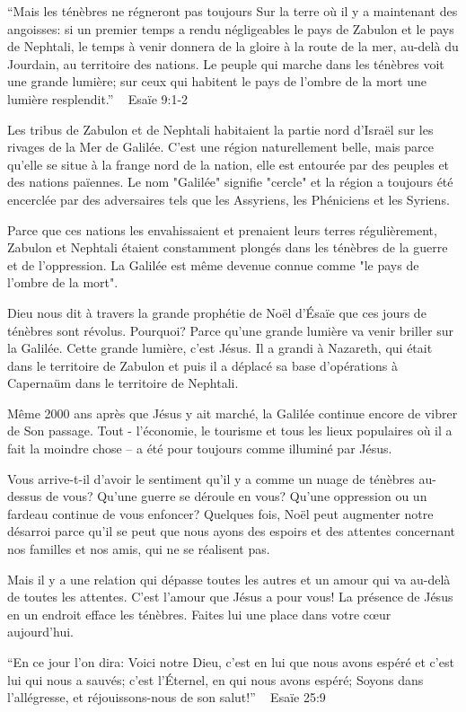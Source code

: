 

“Mais les ténèbres ne régneront pas toujours Sur la terre où il y a maintenant des angoisses: si un premier temps a rendu négligeables le pays de Zabulon et le pays de Nephtali, le temps à venir donnera de la gloire à la route de la mer, au-delà du Jourdain, au territoire des nations. Le peuple qui marche dans les ténèbres voit une grande lumière; sur ceux qui habitent le pays de l’ombre de la mort une lumière resplendit.” ~ Esaïe 9:1-2

Les tribus de Zabulon et de Nephtali habitaient la partie nord d'Israël sur les rivages de la Mer de Galilée. C'est une région naturellement belle, mais parce qu'elle se situe à la frange nord de la nation, elle est entourée par des peuples et des nations païennes. Le nom "Galilée" signifie "cercle" et la région a toujours été encerclée par des adversaires tels que les Assyriens, les Phéniciens et les Syriens.

Parce que ces nations les envahissaient et prenaient leurs terres régulièrement, Zabulon et Nephtali étaient constamment plongés dans les ténèbres de la guerre et de l'oppression. La Galilée est même devenue connue comme "le pays de l'ombre de la mort".

Dieu nous dit à travers la grande prophétie de Noël d'Ésaïe que ces jours de ténèbres sont révolus. Pourquoi? Parce qu'une grande lumière va venir briller sur la Galilée. Cette grande lumière, c'est Jésus. Il a grandi à Nazareth, qui était dans le territoire de Zabulon et puis il a déplacé sa base d'opérations à Capernaüm dans le territoire de Nephtali.

Même 2000 ans après que Jésus y ait marché, la Galilée continue encore de vibrer de Son passage. Tout - l'économie, le tourisme et tous les lieux populaires où il a fait la moindre chose – a été pour toujours comme illuminé par Jésus.

Vous arrive-t-il d'avoir le sentiment qu'il y a comme un nuage de ténèbres au-dessus de vous? Qu'une guerre se déroule en vous? Qu'une oppression ou un fardeau continue de vous enfoncer? Quelques fois, Noël peut augmenter notre désarroi parce qu'il se peut que nous ayons des espoirs et des attentes concernant nos familles et nos amis, qui ne se réalisent pas.

Mais il y a une relation qui dépasse toutes les autres et un amour qui va au-delà de toutes les attentes. C'est l'amour que Jésus a pour vous! La présence de Jésus en un endroit efface les ténèbres. Faites lui une place dans votre cœur aujourd'hui.

“En ce jour l’on dira: Voici notre Dieu, c’est en lui que nous avons espéré et c’est lui qui nous a sauvés; c’est l’Éternel, en qui nous avons espéré; Soyons dans l’allégresse, et réjouissons-nous de son salut!”  ~ Esaïe 25:9 


